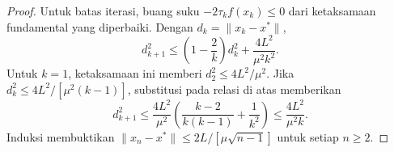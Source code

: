 \begin{proof}
    Untuk batas iterasi, buang suku \(-2\tau_k f(x_k)\leq0\) dari ketaksamaan fundamental yang diperbaiki. Dengan \(d_k=\|x_k-x^*\|\),
    \begin{equation}
        d_{k+1}^2\leq\left(1-\frac{2}{k}\right)d_k^2
        +\frac{4L^2}{\mu^2k^2}.
    \end{equation}
    Untuk \(k=1\), ketaksamaan ini memberi \(d_2^2\leq4L^2/\mu^2\). Jika
    \(d_k^2\leq4L^2/[\mu^2(k-1)]\), substitusi pada relasi di atas memberikan
    \[
        d_{k+1}^2
        \leq \frac{4L^2}{\mu^2}
        \left(\frac{k-2}{k(k-1)}+\frac{1}{k^2}\right)
        \leq \frac{4L^2}{\mu^2k}.
    \]
    Induksi membuktikan \(\|x_n-x^*\|\leq2L/[\mu\sqrt{n-1}]\) untuk setiap \(n\geq2\).
\end{proof}
